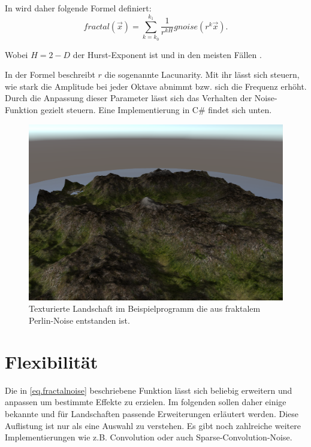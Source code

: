 In \cite{Saupe} wird daher folgende Formel definiert:
\begin{equation} \label{eq.fractalnoise}
	fractal(\vec{x}) = \sum_{k=k_0}^{k_1}\frac{1}{r^{kH}}gnoise(r^k\vec{x}).
\end{equation}

Wobei $H=2-D$ der Hurst-Exponent ist\cite{tuMuenchen} und in den meisten Fällen .

In der Formel beschreibt $r$ die sogenannte Lacunarity. Mit ihr lässt sich steuern, wie stark die Amplitude bei jeder Oktave abnimmt bzw. sich die Frequenz erhöht.
Durch die Anpassung dieser Parameter lässt sich das Verhalten der Noise-Funktion gezielt steuern. Eine Implementierung in C\# findet sich unten.

\begin{figure}
	\centering
	\includegraphics[width=\textwidth]{images/perlin_rendered.png}
	\caption{Texturierte Landschaft im Beispielprogramm die aus fraktalem Perlin-Noise entstanden ist.}\label{img.perlinRendered}
\end{figure}



\section{Flexibilität}\label{NoiseVariationen}
Die in \ref{eq.fractalnoise} beschriebene Funktion lässt sich beliebig erweitern und anpassen um bestimmte Effekte zu erzielen. Im folgenden sollen daher einige bekannte und für Landschaften passende Erweiterungen erläutert werden. Diese Auflistung ist nur als eine Auswahl zu verstehen. Es gibt noch zahlreiche weitere Implementierungen wie z.B. Convolution oder auch Sparse-Convolution-Noise\cite{texturingAndModeling}.

